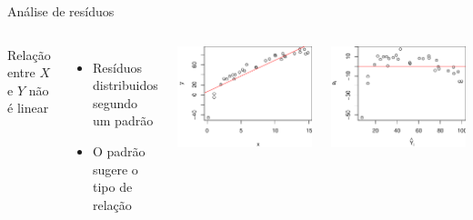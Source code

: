 \documentclass{beamer}\usepackage[]{graphicx}\usepackage[]{color}
\newenvironment{knitrout}{}{} %
\renewenvironment{knitrout}{\setlength{\topsep}{0mm}}{}
\begin{document}
\begin{frame}{Análise de resíduos}

\begin{columns}[c]

\small


Relação entre $X$ e $Y$ não é linear

\bigskip
\begin{itemize}
\item Resíduos distribuidos segundo um padrão
\item O padrão sugere o tipo de relação
\end{itemize}


\begin{knitrout}
\color{fgcolor}
\includegraphics[width=1\linewidth]{figure/r12-1} 

\includegraphics[width=1\linewidth]{figure/r12-2} 

\end{knitrout}
\end{columns}

\end{frame}
\end{document}

